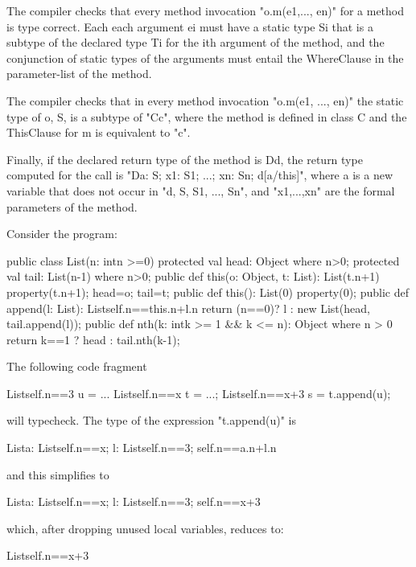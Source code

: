\begin{staticrule*}
    The compiler checks that every method invocation \xcd"o.m(e1,..., en)"
    for a method is type correct. Each each argument ei must have a
    static type Si that is a subtype of the declared type Ti for the ith
    argument of the method, and the conjunction of static types
    of the arguments must entail the WhereClause in the parameter-list
    of the method.

    The compiler checks that in every method invocation \xcd"o.m(e1, ..., en)"
    the static type of o, S, is a subtype of \xcd"C{c}", where the method
    is defined in class C and the ThisClause for m is equivalent to
    \xcd"c".

    Finally, if the declared return type of the method is D{d}, the
    return type computed for the call is
    \xcd"D{a: S; x1: S1; ...; xn: Sn; d[a/this]}", where a is a new
    variable that does not occur in
    \xcd"d, S, S1, ..., Sn", and \xcd"x1,...,xn" are the formal
    parameters of the method.
\end{staticrule*}

\begin{example}
Consider the program:
\begin{xten}
public class List(n: int{n >=0}) {
  protected val head: Object where n>0;
  protected val tail: List(n-1) where n>0;
  public def this(o: Object, t: List): List(t.n+1) {
     property(t.n+1);
     head=o;
     tail=t;
  }
  public def this(): List(0) {
     property(0);
  }
  public def append(l: List): List{self.n==this.n+l.n} {
      return (n==0)? l
         : new List(head, tail.append(l)); 
  }
  public def nth(k: int{k >= 1 && k <= n}): Object
    where n > 0 {
      return k==1 ? head : tail.nth(k-1);
  }
}
\end{xten}

The following code fragment
\begin{xten}
List{self.n==3} u = ...
List{self.n==x} t = ...;
List{self.n==x+3} s = t.append(u);
\end{xten}
\noindent will typecheck. The type of the expression \xcd"t.append(u)" is 
\begin{xten}
List{a: List{self.n==x}; 
     l: List{self.n==3}; self.n==a.n+l.n}  
\end{xten}
\noindent and this simplifies to
\begin{xten}
List{a: List{self.n==x}; 
     l: List{self.n==3}; self.n==x+3}  
\end{xten}
\noindent which, after dropping unused local variables, reduces to:
\begin{xten}
List{self.n==x+3}
\end{xten}
\end{example}

